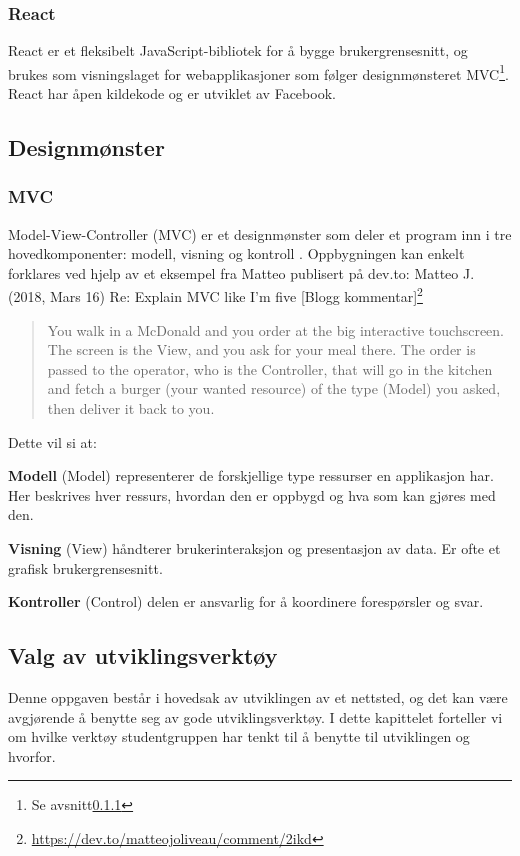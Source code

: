 \subsubsection{React}
React\cite{facebook2019r} er et fleksibelt JavaScript-bibliotek for å bygge brukergrensesnitt, og brukes som visningslaget for webapplikasjoner som følger designmønsteret MVC\footnote{Se avsnitt\ref{sec:tools-mvc}}. React har åpen kildekode og er utviklet av Facebook.

\subsection{Designmønster}

\subsubsection{MVC}
\label{sec:tools-mvc}
Model-View-Controller (MVC)\cite{burbeck87aps} er et designmønster som deler et program inn i tre hovedkomponenter: modell, visning og kontroll \cite{burbeck87aps}. Oppbygningen kan enkelt forklares ved hjelp av et eksempel fra Matteo publisert på dev.to:
Matteo J. (2018, Mars 16) Re: Explain MVC like I'm five [Blogg kommentar]\footnote{\url{https://dev.to/matteojoliveau/comment/2ikd}}
\begin{quote}
    You walk in a McDonald and you order at the big interactive touchscreen.
    The screen is the View, and you ask for your meal there.
    The order is passed to the operator, who is the Controller, that will go in the kitchen and fetch a burger (your wanted resource) of the type (Model) you asked, then deliver it back to you.
\end{quote}

Dette vil si at:

\textbf{Modell} (Model) representerer de forskjellige type ressurser en applikasjon har. Her beskrives hver ressurs, hvordan den er oppbygd og hva som kan gjøres med den.

\textbf{Visning} (View) håndterer brukerinteraksjon og presentasjon av data. Er ofte et grafisk brukergrensesnitt.

\textbf{Kontroller} (Control) delen er ansvarlig for å koordinere forespørsler og svar.

\subsection{Valg av utviklingsverktøy}
Denne oppgaven består i hovedsak av utviklingen av et nettsted, og det kan være avgjørende å benytte seg av gode utviklingsverktøy. I dette kapittelet forteller vi om hvilke verktøy studentgruppen har tenkt til å benytte til utviklingen og hvorfor.

